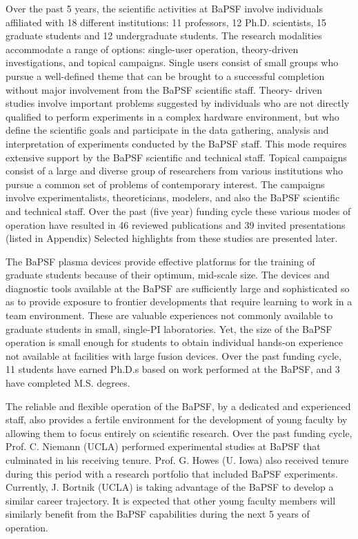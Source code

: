 \documentclass[11pt]{article}
\begin{document}
Over the past 5 years, the scientific activities at BaPSF involve
individuals affiliated with 18 different institutions: 11 professors, 12
Ph.D. scientists, 15 graduate students and 12 undergraduate students.
The research modalities accommodate a range of options: single-user
operation, theory-driven investigations, and topical campaigns. Single
users consist of small groups who pursue a well-defined theme that can
be brought to a successful completion without major involvement from the
BaPSF scientific staff. Theory- driven studies involve important
problems suggested by individuals who are not directly qualified to
perform experiments in a complex hardware environment, but who define
the scientific goals and participate in the data gathering, analysis and
interpretation of experiments conducted by the BaPSF staff. This mode
requires extensive support by the BaPSF scientific and technical staff.
Topical campaigns consist of a large and diverse group of researchers
from various institutions who pursue a common set of problems of
contemporary interest. The campaigns involve experimentalists,
theoreticians, modelers, and also the BaPSF scientific and technical
staff. Over the past (five year) funding cycle these various modes of
operation have resulted in 46 reviewed publications and 39 invited
presentations (listed in Appendix) Selected highlights from these
studies are presented later.

The BaPSF plasma devices provide effective platforms for the training of
graduate students because of their optimum, mid-scale size. The devices
and diagnostic tools available at the BaPSF are sufficiently large and
sophisticated so as to provide exposure to frontier developments that
require learning to work in a team environment. These are valuable
experiences not commonly available to graduate students in small, single-PI laboratories. Yet, the size of the
BaPSF operation is small enough for students to obtain individual
hands-on experience not available at facilities with large fusion
devices. Over the past funding cycle, 11 students have earned Ph.D.s based on
work performed at the BaPSF, and 3 have completed M.S. degrees.

The reliable and flexible operation of the BaPSF, by a dedicated and
experienced staff, also provides a fertile environment for the
development of young faculty by allowing them to focus entirely on
scientific research. Over the past funding cycle, Prof. C. Niemann
(UCLA) performed experimental studies at BaPSF that culminated in his
receiving tenure. Prof. G. Howes (U. Iowa) also received tenure during
this period with a research portfolio that included BaPSF experiments.
Currently, J. Bortnik (UCLA) is taking advantage of the BaPSF to develop
a similar career trajectory. It is expected that other young faculty
members will similarly benefit from the BaPSF capabilities during the
next 5 years of operation.
\end{document}
